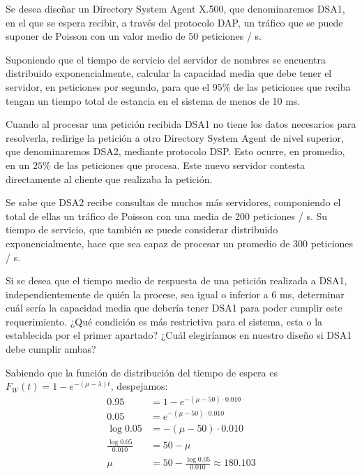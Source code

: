\begin{problem}[20]\label{tema2:prob20}
Se desea diseñar un Directory System Agent X.500, que denominaremos DSA1, en el que se espera recibir, a través del protocolo DAP, un tráfico que se puede suponer de Poisson con un valor medio de 50 peticiones / s.

\ppart
Suponiendo que el tiempo de servicio del servidor de nombres se encuentra distribuido exponencialmente, calcular la capacidad media que debe tener el servidor, en peticiones por segundo, para que el $95 \%$ de las peticiones que reciba tengan un tiempo total de estancia en el sistema de menos de 10 ms.

\ppart
Cuando al procesar una petición recibida DSA1 no tiene los datos necesarios para resolverla, redirige la petición a otro Directory System Agent de nivel superior, que denominaremos DSA2, mediante protocolo DSP. Esto ocurre, en promedio, en un $25\%$ de las peticiones que procesa. Este nuevo servidor contesta directamente al cliente que realizaba la petición.

Se sabe que DSA2 recibe consultas de muchos más servidores, componiendo el total de ellas un tráfico de Poisson con una media de 200 peticiones / s. Su tiempo de servicio, que también se puede considerar distribuido exponencialmente, hace que sea capaz de procesar un promedio de 300 peticiones / s.

Si se desea que el tiempo medio de respuesta de una petición realizada a DSA1, independientemente de quién la procese, sea igual o inferior a 6 ms, determinar cuál sería la capacidad media que debería tener DSA1 para poder cumplir este requerimiento. ¿Qué condición es más restrictiva para el sistema, esta o la establecida por el primer apartado? ¿Cuál elegiríamos en nuestro diseño si DSA1 debe cumplir ambas?
\solution
{}

\spart

Sabiendo que la función de distribución del tiempo de espera es $F_W(t) = 1 - e^{-(μ-λ)t}$, despejamos: \begin{align*}
0.95 &= 1 - e^{-(μ-50)· 0.010} \\
0.05 &= e^{-(μ-50)· 0.010} \\
\log 0.05 &= -(μ-50)· 0.010 \\
\frac{\log 0.05}{0.010} &= 50 - μ \\
μ &= 50 - \frac{\log 0.05}{0.010} \approx 180.103
\end{align*}


\end{problem}
